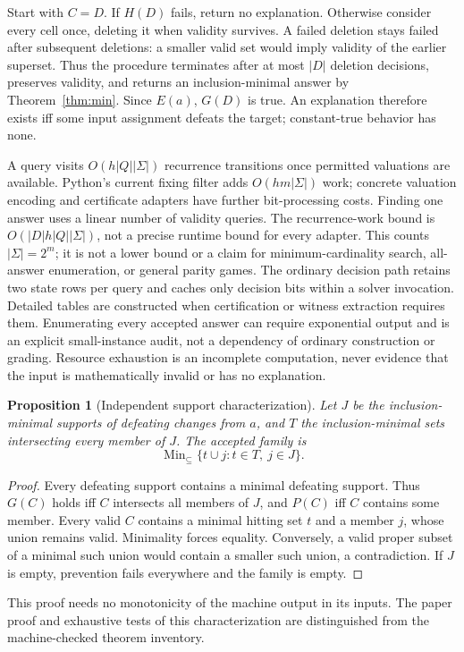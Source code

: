 \documentclass[11pt]{article}
\newtheorem{proposition}{Proposition}
\newcommand{\Min}{\operatorname{Min}_{\subseteq}}
\begin{document}
Start with $C=D$. If $H(D)$ fails, return no explanation.
Otherwise consider every cell once, deleting it when validity survives.
A failed deletion stays failed after subsequent deletions: a smaller valid
set would imply validity of the earlier superset.
Thus the procedure terminates after at most $|D|$ deletion decisions, preserves
validity, and returns an inclusion-minimal answer by Theorem~\ref{thm:min}.
Since $E(a)$, $G(D)$ is true. An explanation therefore exists iff some input
assignment defeats the target; constant-true behavior has none.

A query visits $O(h|Q||\Sigma|)$ recurrence transitions once permitted valuations
are available. Python's current fixing filter adds $O(hm|\Sigma|)$ work; concrete
valuation encoding and certificate adapters have further bit-processing costs.
Finding one answer uses a linear number of validity queries. The recurrence-work
bound is $O(|D|h|Q||\Sigma|)$, not a precise runtime bound for every adapter.
This counts $|\Sigma|=2^m$; it is not a lower bound or a claim for
minimum-cardinality search, all-answer enumeration, or general parity games.
The ordinary decision path retains two state rows per query and caches only
decision bits within a solver invocation. Detailed tables are constructed when
certification or witness extraction requires them. Enumerating every accepted
answer can require exponential output and is an explicit small-instance audit,
not a dependency of ordinary construction or grading. Resource exhaustion is an
incomplete computation, never evidence that the input is mathematically invalid
or has no explanation.

\begin{proposition}[Independent support characterization]
Let $J$ be the inclusion-minimal supports of defeating changes from $a$, and $T$
the inclusion-minimal sets intersecting every member of $J$. The accepted family is
\[
\Min\{t\cup j:t\in T,\ j\in J\}.
\]
\end{proposition}
\begin{proof}
Every defeating support contains a minimal defeating support. Thus $G(C)$ holds
iff $C$ intersects all members of $J$, and $P(C)$ iff $C$ contains some member.
Every valid $C$ contains a minimal hitting set $t$ and a member $j$, whose union
remains valid. Minimality forces equality. Conversely, a valid proper subset
of a minimal such union would contain a smaller such union, a contradiction.
If $J$ is empty, prevention fails everywhere and the family is empty.
\end{proof}
This proof needs no monotonicity of the machine output in its inputs.
The paper proof and exhaustive tests of this characterization are distinguished
from the machine-checked theorem inventory.
\end{document}
